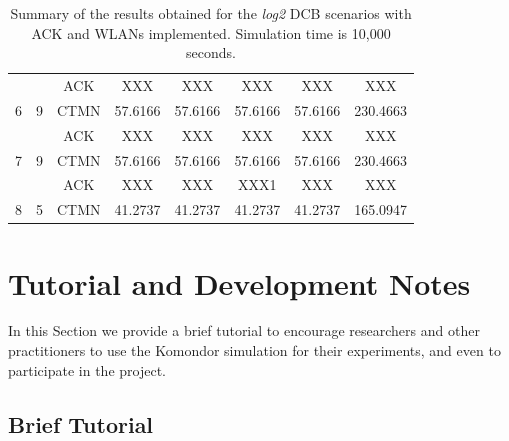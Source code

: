 \documentclass[a4paper]{article}
\begin{document}
\begin{table}[h!]
\begin{tabular}{|c|c|c|c|c|c|c|c|}
		                                            &                                              & ACK       & XXX    &XXX    & XXX    & XXX    & XXX   \\ \cline{3-8} 
		\multirow{-2}{*}{6}                         & \multirow{-2}{*}{9}                          & CTMN          & 57.6166    & 57.6166    & 57.6166    & 57.6166    & 230.4663   \\ \hline
		                                            &                                              & ACK       & XXX    & XXX    & XXX    & XXX    & XXX   \\ \cline{3-8} 
		\multirow{-2}{*}{7}                         & \multirow{-2}{*}{9}                          & CTMN          & 57.6166    & 57.6166    & 57.6166    & 57.6166    & 230.4663   \\ \hline
		                                            &                                              & ACK       & XXX   & XXX    &XXX1    & XXX   &XXX   \\ \cline{3-8} 
		\multirow{-2}{*}{8}                         & \multirow{-2}{*}{5}                          & CTMN          & 41.2737    & 41.2737    & 41.2737    & 41.2737    & 165.0947   \\ \hline
		\end{tabular}
		\caption{Summary of the results obtained for the \textit{log2} DCB scenarios with ACK and WLANs implemented. Simulation time is 10,000 seconds.}
		\label{table:scenario_4wlans}
	\end{table}
	
\section{Tutorial and Development Notes}
\label{section:tutorial_and_development_notes}
	In this Section we provide a brief tutorial to encourage researchers and other practitioners to use the Komondor simulation for their experiments, and even to participate in the project. 
	\subsection{Brief Tutorial}
	\label{section:brief_tutorial}
		
\end{document}
